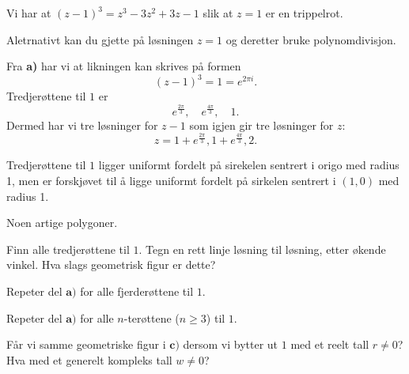 \begin{losning}

\begin{punkt}
Vi har at $(z-1)^3=z^3-3z^2+3z-1$ slik at $z=1$ er en trippelrot.

\noindent
Aletrnativt kan du gjette på løsningen $z=1$ og deretter bruke polynomdivisjon.
\end{punkt}

\begin{punkt}


Fra \textbf{a)} har vi at likningen kan skrives på formen $$(z-1)^3=1=e^{2\pi i}.$$ Tredjerøttene til $1$ er $$e^{\frac{2\pi}{3}}, \quad e^{\frac{4\pi}{3}},\quad 1.$$ Dermed har vi tre løsninger for $z-1$ som igjen gir tre løsninger for $z$: $$z=1+e^{\frac{2\pi}{3}},1+e^{\frac{4\pi}{3}},2.$$

\noindent
Tredjerøttene til $1$ ligger uniformt fordelt på sirekelen sentrert i origo med radius 1, men er forskjøvet til å ligge uniformt fordelt på sirkelen sentrert i $(1,0)$ med radius 1.


\end{punkt}

\end{losning}

\begin{oppgave}
Noen artige polygoner.
\begin{punkt}
Finn alle tredjerøttene til $1$. Tegn en rett linje løsning til løsning, etter økende vinkel. Hva slags geometrisk figur er dette?
\end{punkt}

\begin{punkt}
Repeter del $\textbf{a)}$ for alle fjerderøttene til $1$.
\end{punkt}


\begin{punkt}
Repeter del $\textbf{a)}$ for alle $n$-terøttene ($n\geq 3$) til $1$.
\end{punkt}

\begin{punkt}
Får vi samme geometriske figur i $\textbf{c)}$ dersom vi bytter ut $1$ med et reelt tall $r \neq 0$? Hva med et generelt kompleks tall $w\neq 0$?
\end{punkt}
\end{oppgave}


